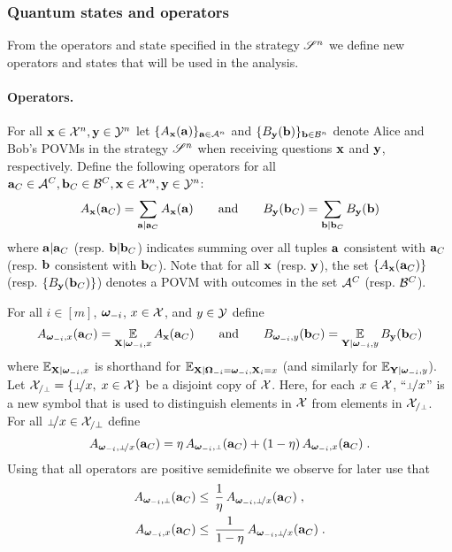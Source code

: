 \subsubsection{Quantum states and operators}
\label{sec:states-operators} 

From the operators and state specified in the strategy $\mathscr{S}^n$ we define new operators and states that will be used in the analysis.

\paragraph{Operators.} For all $\mathbf{x} \in \mathcal{X}^n, \mathbf{y} \in \mathcal{Y}^n$ let $\{A_{\mathbf{x}}(\mathbf{a})\}_{\mathbf{a} \in \mathcal{A}^n}$ and $\{B_{\mathbf{y}}(\mathbf{b})\}_{\mathbf{b} \in \mathcal{B}^n}$ denote Alice and Bob's POVMs in the strategy $\mathscr{S}^n$ when receiving questions $\mathbf{x}$ and $\mathbf{y}$, respectively. Define the following operators for all $\mathbf{a}_C \in \mathcal{A}^C, \mathbf{b}_C \in \mathcal{B}^C, \mathbf{x} \in \mathcal{X}^n, \mathbf{y} \in \mathcal{Y}^n$:
\begin{equation}
\label{eq:states-operators-1}
	A_{\mathbf{x}}(\mathbf{a}_C) = \sum_{\mathbf{a} | \mathbf{a}_C} A_{\mathbf{x}}(\mathbf{a}) \qquad\text{and} \qquad B_{\mathbf{y}}(\mathbf{b}_C) = \sum_{\mathbf{b} | \mathbf{b}_C} B_{\mathbf{y}}(\mathbf{b})
\end{equation}
where $\mathbf{a} | \mathbf{a}_C$ (resp. $\mathbf{b} | \mathbf{b}_C$) indicates summing over all tuples $\mathbf{a}$ consistent with $\mathbf{a}_C$ (resp. $\mathbf{b}$ consistent with $\mathbf{b}_C$). Note that for all $\mathbf{x}$ (resp. $\mathbf{y}$), the set $\{ A_{\mathbf{x}}(\mathbf{a}_C) \}$ (resp. $\{ B_{\mathbf{y}}(\mathbf{b}_C) \}$) denotes a POVM with outcomes in the set $\mathcal{A}^C$ (resp. $\mathcal{B}^C$).

For all $i \in [m]$, ${\boldsymbol{\omega}}_{-i}$, $x \in \mathcal{X}$, and $y \in \mathcal{Y}$ define
\begin{equation}
\label{eq:states-operators-2}
 A_{{\boldsymbol{\omega}}_{-i}, x}(\mathbf{a}_C) = \operatorname*{\mathbb{E}}_{\mathbf{X} | {\boldsymbol{\omega}}_{-i}, x} A_{\mathbf{x}}(\mathbf{a}_C) \qquad \text{and} \qquad  B_{{\boldsymbol{\omega}}_{-i}, y}(\mathbf{b}_C) = \operatorname*{\mathbb{E}}_{\mathbf{Y} | {\boldsymbol{\omega}}_{-i}, y} B_{\mathbf{y}}(\mathbf{b}_C)
\end{equation}
where $\operatorname*{\mathbb{E}}_{\mathbf{X} | {\boldsymbol{\omega}}_{-i}, x}$ is shorthand for $\operatorname*{\mathbb{E}}_{\mathbf{X} | {\boldsymbol{\Omega}}_{-i} = {\boldsymbol{\omega}}_{-i}, \mathbf{X}_i = x}$ (and similarly for $\operatorname*{\mathbb{E}}_{\mathbf{Y} | {\boldsymbol{\omega}}_{-i}, y}$).
Let $\X_{/\dummy} = \{ \dummyx,\; x\in \X\}$ be a disjoint copy of $\mathcal{X}$. Here, for each $x\in \mathcal{X}$, ``$\dummyx$'' is a new symbol that is used to distinguish elements in $\mathcal{X}$ from elements in $\X_{/\dummy}$. 
For all $\dummyx \in \X_{/\perp}$ define
\begin{equation}
\label{eq:states-operators-3}
	A_{\bomega_\mi,\dummyx}(\ba_C) = \eta \, A_{\bomega_\mi,\dummy}(\ba_C) + (1 - \eta) \, A_{\bomega_\mi,x}(\ba_C)\;.
\end{equation}
Using that all operators are positive semidefinite we observe for later use that
\begin{align}
	 A_{\bomega_\mi,\dummy}(\ba_C) &\leq\, \frac{1}{\eta}\, A_{\bomega_\mi,\dummyx}(\ba_C)\;,\label{eq:states-operators-3a}\\
 A_{\bomega_\mi,x}(\ba_C) &\leq\, \frac{1}{1-\eta}\, A_{\bomega_\mi,\dummyx}(\ba_C)\;.\label{eq:states-operators-3b}
\end{align}



